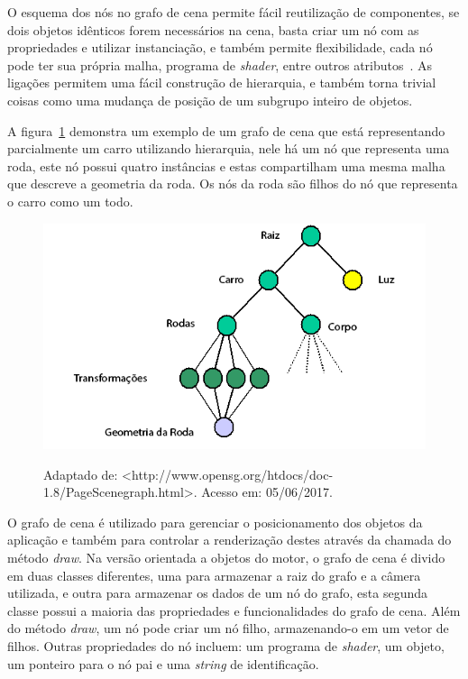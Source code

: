 O esquema dos nós no grafo de cena permite fácil reutilização de componentes, se dois 
objetos idênticos forem necessários na cena, basta criar um nó com as propriedades e 
utilizar instanciação, e também permite flexibilidade, cada nó pode ter sua própria 
malha, programa de \textit{shader}, entre outros atributos~\cite{hughes2014computer}. 
As ligações permitem uma fácil construção de hierarquia, e também torna trivial coisas 
como uma mudança de posição de um subgrupo inteiro de objetos.

A figura~\ref{scenegraphexample} demonstra um exemplo de um grafo de cena que está 
representando parcialmente um carro utilizando hierarquia, nele há um nó que 
representa uma roda, este nó possui quatro instâncias e estas compartilham uma mesma 
malha que descreve a geometria da roda. Os nós da roda são filhos do nó que representa 
o carro como um todo.

\begin{figure}[h!]
    \centering
    \includegraphics[width =.6\textwidth]{../figuras/scenegraph}
    \par\medskip
    Adaptado de: <http://www.opensg.org/htdocs/doc-1.8/PageScenegraph.html>. Acesso 
    em: 05/06/2017.
    \label{scenegraphexample}
\end{figure}

O grafo de cena é utilizado para gerenciar o posicionamento dos objetos da aplicação e 
também para controlar a renderização destes através da chamada do método \textit{draw}. 
Na versão orientada a objetos do motor, o grafo de cena é divido em duas classes diferentes, uma 
para armazenar a raiz do grafo e a câmera utilizada, e outra para armazenar os dados de 
um nó do grafo, esta segunda classe possui a maioria das propriedades e funcionalidades 
do grafo de cena. Além do método \textit{draw}, um nó pode criar um nó filho, 
armazenando-o em um vetor de filhos. Outras propriedades do nó incluem: um programa de 
\textit{shader}, um objeto, um ponteiro para o nó pai e uma \textit{string} de 
identificação.

